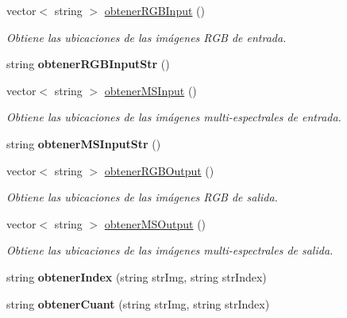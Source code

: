 \begin{DoxyCompactItemize}
vector$<$ string $>$ \mbox{\hyperlink{classIndexCalculation_aacf5294ab87007a511f9f9e9772855af}{obtener\+R\+G\+B\+Input}} ()
\begin{DoxyCompactList}\small\item\em Obtiene las ubicaciones de las imágenes R\+GB de entrada. \end{DoxyCompactList}\item 
\mbox{\label{classIndexCalculation_a4f6d8515c187dde8c9edd962ceee6271}} 
string {\bfseries obtener\+R\+G\+B\+Input\+Str} ()
\item 
vector$<$ string $>$ \mbox{\hyperlink{classIndexCalculation_a889a95c13bc480c1194016ca0e1e9559}{obtener\+M\+S\+Input}} ()
\begin{DoxyCompactList}\small\item\em Obtiene las ubicaciones de las imágenes multi-\/espectrales de entrada. \end{DoxyCompactList}\item 
\mbox{\label{classIndexCalculation_a1acdd629f4edc2c3cb74746832783203}} 
string {\bfseries obtener\+M\+S\+Input\+Str} ()
\item 
vector$<$ string $>$ \mbox{\hyperlink{classIndexCalculation_a23a9f9a23db086109989fb93450a70d7}{obtener\+R\+G\+B\+Output}} ()
\begin{DoxyCompactList}\small\item\em Obtiene las ubicaciones de las imágenes R\+GB de salida. \end{DoxyCompactList}\item 
vector$<$ string $>$ \mbox{\hyperlink{classIndexCalculation_a43b986cd58175d47714a399e7fdfd7e3}{obtener\+M\+S\+Output}} ()
\begin{DoxyCompactList}\small\item\em Obtiene las ubicaciones de las imágenes multi-\/espectrales de salida. \end{DoxyCompactList}\item 
\mbox{\label{classIndexCalculation_ae317d7859059ba6ad24fc54dadd8b2b7}} 
string {\bfseries obtener\+Index} (string str\+Img, string str\+Index)
\item 
\mbox{\label{classIndexCalculation_af7e9c5db2f059a591c0e130737f5dd25}} 
string {\bfseries obtener\+Cuant} (string str\+Img, string str\+Index)

\end{DoxyCompactItemize}
